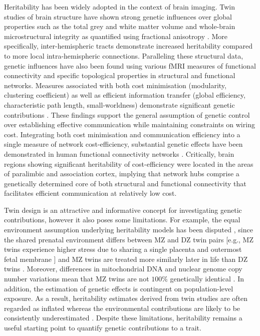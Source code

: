 Heritability has been widely adopted in the context of brain imaging. Twin studies of brain structure have shown strong genetic influences over global properties such as the total grey and white matter volume
\citep{Baare2001,Bohlken2014,Wright2002} and whole-brain microstructural integrity as quantified using fractional anisotropy \citep{Bohlken2014}. More specifically, inter-hemispheric tracts demonstrate increased heritability \mbox{\citep{Shen2014,Sudre2017}} compared to more local intra-hemispheric connections. Paralleling these structural data, genetic influences have also been found using various fMRI measures of functional connectivity \citep{Colclough2017,Fu2015,Glahn2010,Sudre2017} and specific topological properties in structural \citep{Bohlken2014} and functional \mbox{\citep{Fornito2011,Sinclair2015}}  networks. Measures associated with both cost minimisation (modularity, clustering coefficient) as well as efficient information transfer (global efficiency, characteristic path length, small-worldness) demonstrate significant genetic contributions \citep{Sinclair2015,Bohlken2014}. These findings support the general assumption of genetic control over establishing effective communication while maintaining constraints on wiring cost. Integrating both cost minimisation and communication efficiency into a single measure of network cost-efficiency, substantial genetic effects have been demonstrated in human functional connectivity networks \citep{Fornito2011}. Critically, brain regions showing significant heritability of cost-efficiency were located in the areas of paralimbic and association cortex, implying that network hubs comprise a genetically determined core of both structural and functional connectivity that facilitates efficient communication at relatively low cost.

Twin design is an attractive and informative concept for investigating genetic contributions, however it also poses some limitations. For example, the equal environment assumption underlying heritability models has been disputed  \citep{Charney2017,Joseph2002}, since the shared prenatal environment differs between MZ and DZ twin pairs [e.g., MZ twins experience higher stress due to sharing a single placenta and outermost fetal membrane \citep{Corsello2010}] and MZ twins are treated more similarly later in life than DZ twins \citep{Joseph2002}. Moreover, differences in mitochondrial DNA and nuclear genome copy number variations mean that MZ twins are not $100\%$ genetically identical \citep{Bruder2008,Charney2017}. In addition, the estimation of genetic effects is contingent on population-level exposure. As a result, heritability estimates derived from twin studies are often regarded as inflated whereas the environmental contributions are likely to be consistently underestimated \citep{Joseph2002}. Despite these limitations, heritability remains a useful starting point to quantify genetic contributions to a trait.

